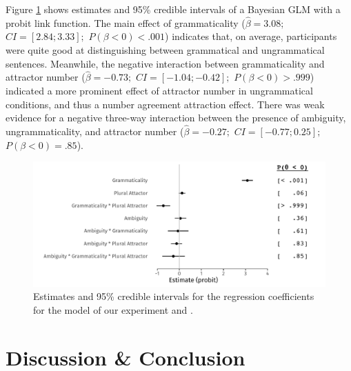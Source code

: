 \documentclass[times,linguex]{glossa}\usepackage[]{graphicx}\usepackage[]{color}
\makeatletter
\def\maxwidth{ %
  \ifdim\Gin@nat@width>\linewidth
    \linewidth
  \else
    \Gin@nat@width
  \fi
}
\newenvironment{kframe}{%
 \def\at@end@of@kframe{}%
 \ifinner\ifhmode%
  \def\at@end@of@kframe{\end{minipage}}%
  \begin{minipage}{\columnwidth}%
 \fi\fi%
 \def\FrameCommand##1{\hskip\@totalleftmargin \hskip-\fboxsep
 \colorbox{shadecolor}{##1}\hskip-\fboxsep
     \hskip-\linewidth \hskip-\@totalleftmargin \hskip\columnwidth}%
 \MakeFramed {\advance\hsize-\width
   \@totalleftmargin\z@ \linewidth\hsize
   \@setminipage}}%
 {\par\unskip\endMakeFramed%
 \at@end@of@kframe}
\newenvironment{knitrout}{}{} %
\makeatother
\begin{document}
Figure \ref{fig:ResponseModel} shows estimates and 95\% credible intervals of a Bayesian GLM with a probit link function. The main effect of grammaticality ($\hat{\beta}=3.08;$ $CI=[2.84; 3.33];$ $P(\beta<0)< .001$) indicates that, on average, participants were quite good at distinguishing between grammatical and ungrammatical sentences. Meanwhile, the negative interaction between grammaticality and attractor number ($\hat{\beta}=-0.73;$ $CI=[-1.04; -0.42];$ $P(\beta<0)> .999$) indicated a more prominent effect of attractor number in ungrammatical conditions, and thus a number agreement attraction effect. There was weak evidence for a negative three-way interaction between the presence of ambiguity, ungrammaticality, and attractor number ($\hat{\beta}=-0.27;$ $CI=[-0.77; 0.25];$ $P(\beta<0)=    .85$).


\begin{figure}[hbt!]
\centering
\caption{Estimates and 95\% credible intervals for the regression coefficients for the model of our experiment and \citet{LagoEtAl:2018}.}

\begin{knitrout}
\color{fgcolor}\begin{kframe}


{\ttfamily\noindent\color{warningcolor}{\#\# Warning in is.na(x): is.na() applied to non-(list or vector) of type 'expression'}}\end{kframe}
\includegraphics[width=\maxwidth]{figure/ResponseModel-1} 
\end{knitrout}

\label{fig:ResponseModel}
\end{figure}


\section{Discussion \& Conclusion}
\end{document}

